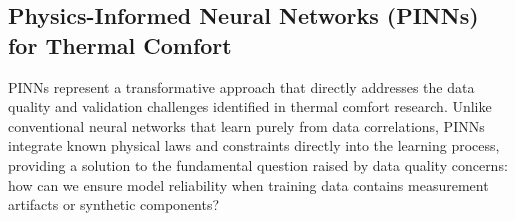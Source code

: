



\subsection{Physics-Informed Neural Networks (PINNs) for Thermal Comfort}\label{seg:pinn}

PINNs represent a transformative approach that directly addresses the data quality and validation challenges identified in thermal comfort research. Unlike conventional neural networks that learn purely from data correlations, PINNs integrate known physical laws and constraints directly into the learning process, providing a solution to the fundamental question raised by data quality concerns: how can we ensure model reliability when training data contains measurement artifacts or synthetic components?

